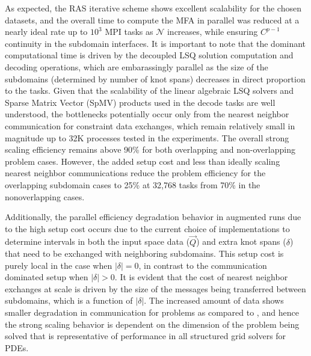 As expected, the RAS iterative scheme shows excellent scalability for the chosen datasets, and the overall time to compute the MFA in parallel was reduced at a nearly ideal rate up to $10^3$ MPI tasks as $\mathcal{N}$ increases, while ensuring $C^{p-1}$ continuity in the subdomain interfaces.  It is important to note that the dominant computational time is driven by the decoupled LSQ solution computation and decoding operations, which are embarassingly parallel as the size of the subdomains (determined by number of knot spans) decreases in direct proportion to the tasks. Given that the scalability of the linear algebraic LSQ solvers \cite{benzi2002, dalcin2011} and Sparse Matrix Vector (SpMV) products used in the decode tasks are well understood, the bottlenecks potentially occur only from the nearest neighbor communication for constraint data exchanges, which remain relatively small in magnitude up to 32K processes tested in the  experiments. The overall strong scaling efficiency remains above 90\% for both overlapping and non-overlapping  problem cases. However, the added setup cost and less than ideally scaling nearest neighbor communications reduce the  problem efficiency for the overlapping subdomain cases to 25\% at 32,768 tasks from 70\% in the nonoverlapping cases. 

Additionally, the parallel efficiency degradation behavior in augmented runs due to the high setup cost occurs due to the current choice of implementations to determine intervals in both the input space data ($\vec{Q}$) and extra knot spans ($\delta$) that need to be exchanged with neighboring subdomains. This setup cost is purely local in the case when $\left| \delta \right|=0$, in contrast to the communication dominated setup when $\left| \delta \right| > 0$. 
It is evident that the cost of nearest neighbor exchanges at scale is driven by the size of the messages being transferred between subdomains, which is a function of $\left| \delta \right|$. The increased amount of data shows smaller degradation in communication for  problems as compared to , and hence the strong scaling behavior is dependent on the dimension of the problem being solved that is representative of performance in all structured grid solvers for PDEs.



